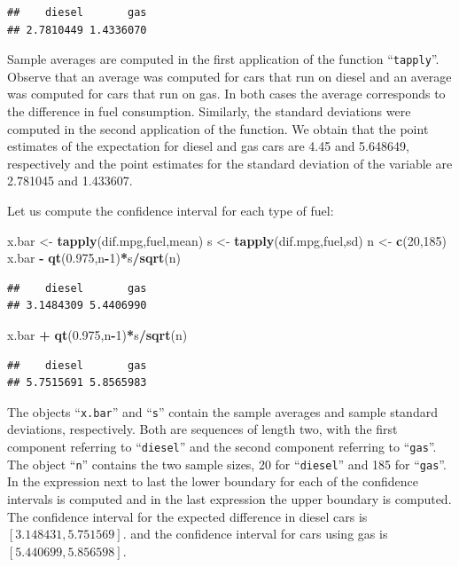 \documentclass[]{krantz}
\makeatletter
\newenvironment{Shaded}{\begin{snugshade}}{\end{snugshade}}
\newcommand{\KeywordTok}[1]{\textcolor[rgb]{0.13,0.29,0.53}{\textbf{#1}}}
\newcommand{\DecValTok}[1]{\textcolor[rgb]{0.00,0.00,0.81}{#1}}
\newcommand{\FloatTok}[1]{\textcolor[rgb]{0.00,0.00,0.81}{#1}}
\newcommand{\StringTok}[1]{\textcolor[rgb]{0.31,0.60,0.02}{#1}}
\newcommand{\OperatorTok}[1]{\textcolor[rgb]{0.81,0.36,0.00}{\textbf{#1}}}
\newcommand{\NormalTok}[1]{#1}
\newenvironment{kframe}{%
\medskip{}
\setlength{\fboxsep}{.8em}
 \def\at@end@of@kframe{}%
 \ifinner\ifhmode%
  \def\at@end@of@kframe{\end{minipage}}%
  \begin{minipage}{\columnwidth}%
 \fi\fi%
 \def\FrameCommand##1{\hskip\@totalleftmargin \hskip-\fboxsep
 \colorbox{shadecolor}{##1}\hskip-\fboxsep
     \hskip-\linewidth \hskip-\@totalleftmargin \hskip\columnwidth}%
 \MakeFramed {\advance\hsize-\width
   \@totalleftmargin\z@ \linewidth\hsize
   \@setminipage}}%
 {\par\unskip\endMakeFramed%
 \at@end@of@kframe}
\renewenvironment{Shaded}{\begin{kframe}}{\end{kframe}}
\theoremstyle{definition}
\theoremstyle{definition}
\theoremstyle{definition}
\theoremstyle{remark}
\makeatother
\begin{document}
\begin{verbatim}
##    diesel       gas 
## 2.7810449 1.4336070
\end{verbatim}

Sample averages are computed in the first application of the function
``\texttt{tapply}''. Observe that an average was computed for cars that
run on diesel and an average was computed for cars that run on gas. In
both cases the average corresponds to the difference in fuel
consumption. Similarly, the standard deviations were computed in the
second application of the function. We obtain that the point estimates
of the expectation for diesel and gas cars are 4.45 and 5.648649,
respectively and the point estimates for the standard deviation of the
variable are 2.781045 and 1.433607.

Let us compute the confidence interval for each type of fuel:

\begin{Shaded}
\begin{Highlighting}[]
\NormalTok{x.bar <-}\StringTok{ }\KeywordTok{tapply}\NormalTok{(dif.mpg,fuel,mean)}
\NormalTok{s <-}\StringTok{ }\KeywordTok{tapply}\NormalTok{(dif.mpg,fuel,sd)}
\NormalTok{n <-}\StringTok{ }\KeywordTok{c}\NormalTok{(}\DecValTok{20}\NormalTok{,}\DecValTok{185}\NormalTok{)}
\NormalTok{x.bar }\OperatorTok{-}\StringTok{ }\KeywordTok{qt}\NormalTok{(}\FloatTok{0.975}\NormalTok{,n}\OperatorTok{-}\DecValTok{1}\NormalTok{)}\OperatorTok{*}\NormalTok{s}\OperatorTok{/}\KeywordTok{sqrt}\NormalTok{(n)}
\end{Highlighting}
\end{Shaded}

\begin{verbatim}
##    diesel       gas 
## 3.1484309 5.4406990
\end{verbatim}

\begin{Shaded}
\begin{Highlighting}[]
\NormalTok{x.bar }\OperatorTok{+}\StringTok{ }\KeywordTok{qt}\NormalTok{(}\FloatTok{0.975}\NormalTok{,n}\OperatorTok{-}\DecValTok{1}\NormalTok{)}\OperatorTok{*}\NormalTok{s}\OperatorTok{/}\KeywordTok{sqrt}\NormalTok{(n)}
\end{Highlighting}
\end{Shaded}

\begin{verbatim}
##    diesel       gas 
## 5.7515691 5.8565983
\end{verbatim}

The objects ``\texttt{x.bar}'' and ``\texttt{s}'' contain the sample
averages and sample standard deviations, respectively. Both are
sequences of length two, with the first component referring to
``\texttt{diesel}'' and the second component referring to
``\texttt{gas}''. The object ``\texttt{n}'' contains the two sample
sizes, 20 for ``\texttt{diesel}'' and 185 for ``\texttt{gas}''. In the
expression next to last the lower boundary for each of the confidence
intervals is computed and in the last expression the upper boundary is
computed. The confidence interval for the expected difference in diesel
cars is \([3.148431, 5.751569]\). and the confidence interval for cars
using gas is \([5.440699, 5.856598]\).
\end{document}
